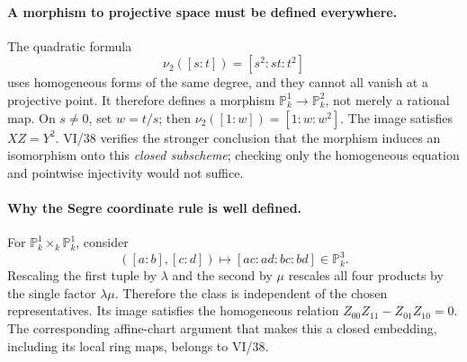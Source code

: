 \paragraph{A morphism to projective space must be defined everywhere.}
The quadratic formula
\[
 \nu_2([s:t])=[s^2:st:t^2]
\]
uses homogeneous forms of the same degree, and they cannot all
vanish at a projective point.  It therefore defines a morphism
\(\mathbb P_k^1\to\mathbb P_k^2\), not merely a rational map.
On \(s\ne0\), set \(w=t/s\); then
\(\nu_2([1:w])=[1:w:w^2]\).
The image satisfies \(XZ=Y^2\).
VI/38 verifies the stronger conclusion that the morphism induces
an isomorphism onto this \emph{closed subscheme}; checking only the
homogeneous equation and pointwise injectivity would not suffice.

\paragraph{Why the Segre coordinate rule is well defined.}
For \(\mathbb P_k^1\times_k\mathbb P_k^1\), consider
\[
 ([a:b],[c:d])\longmapsto[ac:ad:bc:bd]\in\mathbb P_k^3.
\]
Rescaling the first tuple by \(\lambda\) and the second by
\(\mu\) rescales all four products by the single factor
\(\lambda\mu\).  Therefore the class is independent of the chosen
representatives.  Its image satisfies the homogeneous relation
\(Z_{00}Z_{11}-Z_{01}Z_{10}=0\).
The corresponding affine-chart argument that makes this a closed
embedding, including its local ring maps, belongs to VI/38.
